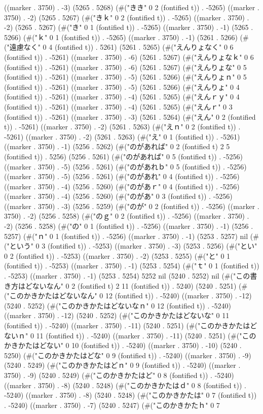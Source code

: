 {{((marker . 3750) . -3) (5265 . 5268) (#("きき" 0 2 (fontified t)) . -5265) ((marker . 3750) . -2) (5265 . 5267) (#("きｋ" 0 2 (fontified t)) . -5265) ((marker . 3750) . -2) (5265 . 5267) (#("き" 0 1 (fontified t)) . -5265) ((marker . 3750) . -1) (5265 . 5266) (#("ｋ" 0 1 (fontified t)) . -5265) ((marker . 3750) . -1) (5261 . 5266) (#("遠慮なく" 0 4 (fontified t)) . 5261) (5261 . 5265) (#("えんりょなく" 0 6 (fontified t)) . -5261) ((marker . 3750) . -6) (5261 . 5267) (#("えんりょなｋ" 0 6 (fontified t)) . -5261) ((marker . 3750) . -6) (5261 . 5267) (#("えんりょな" 0 5 (fontified t)) . -5261) ((marker . 3750) . -5) (5261 . 5266) (#("えんりょｎ" 0 5 (fontified t)) . -5261) ((marker . 3750) . -5) (5261 . 5266) (#("えんりょ" 0 4 (fontified t)) . -5261) ((marker . 3750) . -4) (5261 . 5265) (#("えんｒｙ" 0 4 (fontified t)) . -5261) ((marker . 3750) . -4) (5261 . 5265) (#("えんｒ" 0 3 (fontified t)) . -5261) ((marker . 3750) . -3) (5261 . 5264) (#("えん" 0 2 (fontified t)) . -5261) ((marker . 3750) . -2) (5261 . 5263) (#("えｎ" 0 2 (fontified t)) . -5261) ((marker . 3750) . -2) (5261 . 5263) (#("え" 0 1 (fontified t)) . -5261) ((marker . 3750) . -1) (5256 . 5262) (#("のがあれば" 0 2 (fontified t) 2 5 (fontified t)) . 5256) (5256 . 5261) (#("のがあれば" 0 5 (fontified t)) . -5256) ((marker . 3750) . -5) (5256 . 5261) (#("のがあれｂ" 0 5 (fontified t)) . -5256) ((marker . 3750) . -5) (5256 . 5261) (#("のがあれ" 0 4 (fontified t)) . -5256) ((marker . 3750) . -4) (5256 . 5260) (#("のがあｒ" 0 4 (fontified t)) . -5256) ((marker . 3750) . -4) (5256 . 5260) (#("のがあ" 0 3 (fontified t)) . -5256) ((marker . 3750) . -3) (5256 . 5259) (#("のが" 0 2 (fontified t)) . -5256) ((marker . 3750) . -2) (5256 . 5258) (#("のｇ" 0 2 (fontified t)) . -5256) ((marker . 3750) . -2) (5256 . 5258) (#("の" 0 1 (fontified t)) . -5256) ((marker . 3750) . -1) (5256 . 5257) (#("ｎ" 0 1 (fontified t)) . -5256) ((marker . 3750) . -1) (5253 . 5257) nil (#("という" 0 3 (fontified t)) . -5253) ((marker . 3750) . -3) (5253 . 5256) (#("とい" 0 2 (fontified t)) . -5253) ((marker . 3750) . -2) (5253 . 5255) (#("と" 0 1 (fontified t)) . -5253) ((marker . 3750) . -1) (5253 . 5254) (#("ｔ" 0 1 (fontified t)) . -5253) ((marker . 3750) . -1) (5253 . 5254) 5252 nil (5240 . 5252) nil (#("この書き方はどないなん" 0 2 (fontified t) 2 11 (fontified t)) . 5240) (5240 . 5251) (#("このかきかたはどないなん" 0 12 (fontified t)) . -5240) ((marker . 3750) . -12) (5240 . 5252) (#("このかきかたはどないなｎ" 0 12 (fontified t)) . -5240) ((marker . 3750) . -12) (5240 . 5252) (#("このかきかたはどないな" 0 11 (fontified t)) . -5240) ((marker . 3750) . -11) (5240 . 5251) (#("このかきかたはどないｎ" 0 11 (fontified t)) . -5240) ((marker . 3750) . -11) (5240 . 5251) (#("このかきかたはどない" 0 10 (fontified t)) . -5240) ((marker . 3750) . -10) (5240 . 5250) (#("このかきかたはどな" 0 9 (fontified t)) . -5240) ((marker . 3750) . -9) (5240 . 5249) (#("このかきかたはどｎ" 0 9 (fontified t)) . -5240) ((marker . 3750) . -9) (5240 . 5249) (#("このかきかたはど" 0 8 (fontified t)) . -5240) ((marker . 3750) . -8) (5240 . 5248) (#("このかきかたはｄ" 0 8 (fontified t)) . -5240) ((marker . 3750) . -8) (5240 . 5248) (#("このかきかたは" 0 7 (fontified t)) . -5240) ((marker . 3750) . -7) (5240 . 5247) (#("このかきかたｈ" 0 7 }}
